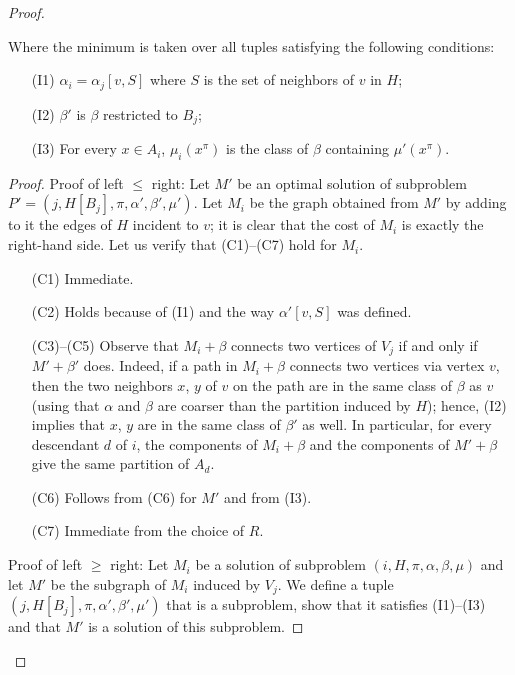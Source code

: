\begin{proof}
\begin{claim}
Where the minimum is taken over all tuples satisfying the following conditions:

\begin{itemize}
    \item[(I1)] \(\alpha_i = \alpha_j[v, S]\) where \(S\) is the set of neighbors of \(v\) in \(H\);
    \item[(I2)] \(\beta'\) is \(\beta\) restricted to \(B_j\);
    \item[(I3)] For every \(x \in A_i\), \(\mu_i(x^\pi)\) is the class of \(\beta\) containing \(\mu'(x^\pi)\).
\end{itemize}

\end{claim}

\begin{proof}
Proof of left \(\leq\) right:
Let \(M'\) be an optimal solution of subproblem \(P' = (j , H[B_j], \pi, \alpha', \beta', \mu')\). Let \(M_i\) be the graph obtained from \(M'\) by adding to it the edges of \(H\) incident to \(v\); it is clear that the cost of \(M_i\) is exactly the right-hand side. Let us verify that (C1)–(C7) hold for \(M_i\).

\begin{itemize}
    \item[(C1)] Immediate.
    \item[(C2)] Holds because of (I1) and the way \(\alpha'[v, S]\) was defined.
    \item[(C3)–(C5)] Observe that \(M_i + \beta\) connects two vertices of \(V_j\) if and only if \(M' + \beta'\) does. Indeed, if a path in \(M_i + \beta\) connects two vertices via vertex \(v\), then the two neighbors \(x\), \(y\) of \(v\) on the path are in the same class of \(\beta\) as \(v\) (using that \(\alpha\) and \(\beta\) are coarser than the partition induced by \(H\)); hence, (I2) implies that \(x\), \(y\) are in the same class of \(\beta'\) as well. In particular, for every descendant \(d\) of \(i\), the components of \(M_i + \beta\) and the components of \(M' + \beta\) give the same partition of \(A_d\).
    \item[(C6)] Follows from (C6) for \(M'\) and from (I3).
    \item[(C7)] Immediate from the choice of \(R\).
\end{itemize}

Proof of left \(\geq\) right:
Let \(M_i\) be a solution of subproblem \((i, H, \pi, \alpha, \beta, \mu)\) and let \(M'\) be the subgraph of \(M_i\) induced by \(V_j\). We define a tuple \((j, H[B_j], \pi, \alpha', \beta', \mu')\) that is a subproblem, show that it satisfies (I1)–(I3) and that \(M'\) is a solution of this subproblem.


\end{proof}
\end{proof}
